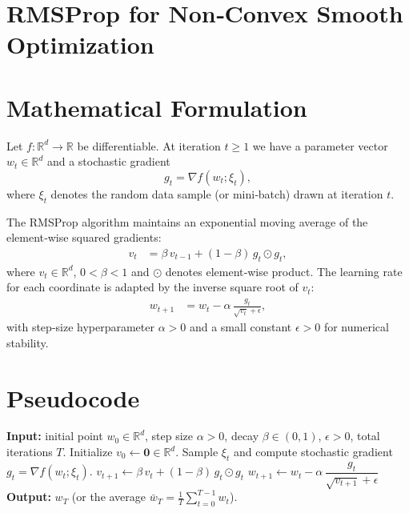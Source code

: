 \documentclass[11pt]{article}
\newcommand{\R}{\mathbb{R}}
\begin{document}
\section*{RMSProp for Non‑Convex Smooth Optimization}

\section*{Mathematical Formulation}
Let $f:\R^{d}\rightarrow \R$ be differentiable.  
At iteration $t\ge 1$ we have a parameter vector $w_t\in\R^{d}$ and a stochastic gradient 
\[
g_t = \nabla f(w_t;\xi_t),
\]
where $\xi_t$ denotes the random data sample (or mini‑batch) drawn at iteration $t$.

The RMSProp algorithm maintains an exponential moving average of the element‑wise squared gradients:
\begin{align}
    v_t &= \beta\, v_{t-1} + (1-\beta)\, g_t\odot g_t,
    \label{eq:vt}
\end{align}
where $v_t\in\R^{d}$, $0<\beta<1$ and $\odot$ denotes element‑wise product.  
The learning rate for each coordinate is adapted by the inverse square root of $v_t$:
\begin{align}
    w_{t+1} &= w_t - \alpha \, \frac{g_t}{\sqrt{v_t}+\epsilon},
    \label{eq:update}
\end{align}
with step‑size hyperparameter $\alpha>0$ and a small constant $\epsilon>0$ for numerical stability.

\section*{Pseudocode}
\begin{algorithm}[H]
\caption{RMSProp (non‑convex setting)}\label{alg:rmsprop}
\begin{algorithmic}[1]
\State \textbf{Input:} initial point $w_0\in\R^{d}$, step size $\alpha>0$, decay $\beta\in(0,1)$, $\epsilon>0$, total iterations $T$.
\State Initialize $v_0\gets \mathbf{0}\in\R^{d}$.
    \State Sample $\xi_t$ and compute stochastic gradient $g_t=\nabla f(w_t;\xi_t)$.
    \State $v_{t+1}\gets \beta\,v_t+(1-\beta)\,g_t\odot g_t$ \hfill{}
    \State $w_{t+1}\gets w_t-\alpha\,\dfrac{g_t}{\sqrt{v_{t+1}}+\epsilon}$ \hfill{}
\EndFor
\State \textbf{Output:} $w_T$ (or the average $\bar w_T=\frac1T\sum_{t=0}^{T-1}w_t$).
\end{algorithmic}
\end{algorithm}
\end{document}

